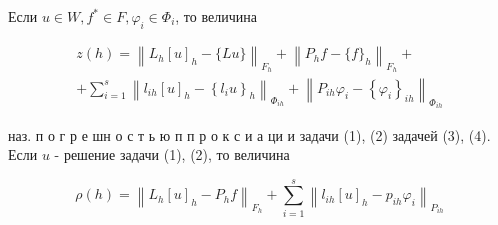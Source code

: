 \documentclass[10pt]{article}
\begin{document}
Если $u \in W, f^{*} \in F, \varphi_{i} \in \Phi_{i}$, то величина



\[

\begin{gathered}

z(h)=\left\|L_{h}[u]_{h}-\{L u\}\right\|_{F_{h}}+\left\|P_{h} f-\{f\}_{h}\right\|_{F_{h}}+ \\

+\sum_{i=1}^{s}\left\|l_{i h}[u]_{h}-\left\{l_{i} u\right\}_{h}\right\|_{\Phi_{i h}}+\left\|P_{i h} \varphi_{i}-\left\{\varphi_{i}\right\}_{i h}\right\|_{\Phi_{i h}}

\end{gathered}

\]



наз. п о г р е шн о с т ь ю п п р о к с и а ци и задачи (1), (2) задачей (3), (4). Если $u$ - решение задачи (1), (2), то величина



\[

\rho(h)=\left\|L_{h}[u]_{h}-P_{h} f\right\|_{F_{h}}+\sum_{i=1}^{s}\left\|l_{i h}[u]_{h}-p_{i h} \varphi_{i}\right\|_{P_{i h}}

\]
\end{document}
